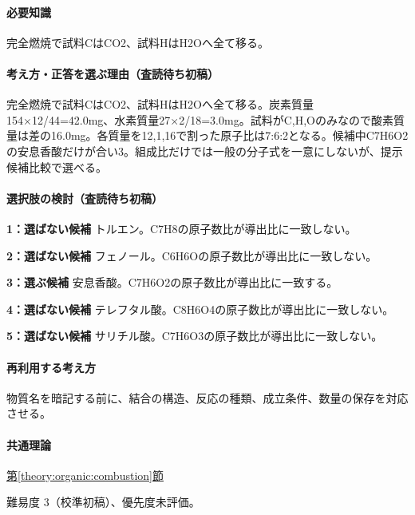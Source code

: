\paragraph{必要知識} 完全燃焼で試料CはCO2、試料HはH2Oへ全て移る。

\paragraph{考え方・正答を選ぶ理由（査読待ち初稿）} 完全燃焼で試料CはCO2、試料HはH2Oへ全て移る。炭素質量154×12/44=\allowbreak{}42.0mg、水素質量27×2/18=\allowbreak{}3.0mg。試料がC,H,Oのみなので酸素質量は差の16.0mg。各質量を12,1,16で割った原子比は7:6:2となる。候補中C7H6O2の安息香酸だけが合い3。組成比だけでは一般の分子式を一意にしないが、提示候補比較で選べる。

\paragraph{選択肢の検討（査読待ち初稿）}\mbox{}\par

\noindent\textbf{1：選ばない候補} トルエン。C7H8の原子数比が導出比に一致しない。\par

\noindent\textbf{2：選ばない候補} フェノール。C6H6Oの原子数比が導出比に一致しない。\par

\noindent\textbf{3：選ぶ候補} 安息香酸。C7H6O2の原子数比が導出比に一致する。\par

\noindent\textbf{4：選ばない候補} テレフタル酸。C8H6O4の原子数比が導出比に一致しない。\par

\noindent\textbf{5：選ばない候補} サリチル酸。C7H6O3の原子数比が導出比に一致しない。\par

\paragraph{再利用する考え方} 物質名を暗記する前に、結合の構造、反応の種類、成立条件、数量の保存を対応させる。

\paragraph{共通理論} \hyperref[theory:organic:combustion]{第\ref*{theory:organic:combustion}節}

\par 難易度 3（校準初稿）、優先度未評価。

